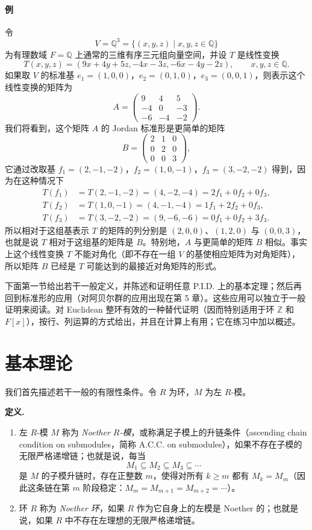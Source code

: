 \paragraph{例}
令
\[
V=\mathbb Q^3=\{(x,y,z)\mid x,y,z\in\mathbb Q\}
\]
为有理数域 $F=\mathbb Q$ 上通常的三维有序三元组向量空间，并设 $T$ 是线性变换
\[
T(x,y,z)=(9x+4y+5z,-4x-3z,-6x-4y-2z),\qquad x,y,z\in\mathbb Q.
\]
如果取 $V$ 的标准基 $e_1=(1,0,0)$，$e_2=(0,1,0)$，$e_3=(0,0,1)$，则表示这个线性变换的矩阵为
\[
A=\begin{pmatrix}
9&4&5\\
-4&0&-3\\
-6&-4&-2
\end{pmatrix}.
\]
我们将看到，这个矩阵 $A$ 的 Jordan 标准形是更简单的矩阵
\[
B=\begin{pmatrix}
2&1&0\\
0&2&0\\
0&0&3
\end{pmatrix},
\]
它通过改取基 $f_1=(2,-1,-2)$，$f_2=(1,0,-1)$，$f_3=(3,-2,-2)$ 得到，因为在这种情况下
\[
\begin{aligned}
T(f_1)&=T(2,-1,-2)=(4,-2,-4)=2f_1+0f_2+0f_3,\\
T(f_2)&=T(1,0,-1)=(4,-1,-4)=1f_1+2f_2+0f_3,\\
T(f_3)&=T(3,-2,-2)=(9,-6,-6)=0f_1+0f_2+3f_3.
\end{aligned}
\]
所以相对于这组基表示 $T$ 的矩阵的列分别是 $(2,0,0)$、$(1,2,0)$ 与 $(0,0,3)$，也就是说 $T$ 相对于这组基的矩阵是 $B$。特别地，$A$ 与更简单的矩阵 $B$ 相似。事实上这个线性变换 $T$ 不能对角化（即不存在一组 $V$ 的基使相应矩阵为对角矩阵），所以矩阵 $B$ 已经是 $T$ 可能达到的最接近对角矩阵的形式。

下面第一节给出若干一般定义，并陈述和证明任意 P.I.D. 上的基本定理；然后再回到标准形的应用（对阿贝尔群的应用出现在第 5 章）。这些应用可以独立于一般证明来阅读。对 Euclidean 整环有效的一种替代证明（因而特别适用于环 $\mathbb Z$ 和 $F[x]$），按行、列运算的方式给出，并且在计算上有用；它在练习中加以概述。

\section{基本理论}

我们首先描述若干一般的有限性条件。令 $R$ 为环，$M$ 为左 $R$-模。

\noindent\textbf{定义.}
\begin{enumerate}[label=(\arabic*)]
\item 左 $R$-模 $M$ 称为 \emph{Noether $R$-模}，或称满足子模上的升链条件（ascending chain condition on submodules，简称 A.C.C. on submodules），如果不存在子模的无限严格递增链；也就是说，每当
\[
M_1\subseteq M_2\subseteq M_3\subseteq\cdots
\]
是 $M$ 的子模升链时，存在正整数 $m$，使得对所有 $k\geq m$ 都有 $M_k=M_m$（因此这条链在第 $m$ 阶段稳定：$M_m=M_{m+1}=M_{m+2}=\cdots$）。
\item 环 $R$ 称为 \emph{Noether 环}，如果 $R$ 作为它自身上的左模是 Noether 的；也就是说，如果 $R$ 中不存在左理想的无限严格递增链。
\end{enumerate}


